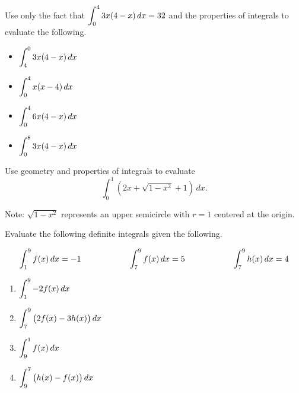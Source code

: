 \documentclass[12pt]{article}
\begin{document}
\Example Use only the fact that $\displaystyle\int_0^4 3x(4-x)\,dx=32$ and the properties of integrals to evaluate the following.
\begin{itemize}
	\item[\tc{1}] $\displaystyle\int_4^0 3x(4-x)\,dx$
	
	\vspace{15mm}
	
	\item[\tc{2}] $\displaystyle\int_0^4 x(x-4)\,dx$
	
	\vspace{15mm}
	
	\item[\tc{3}] $\displaystyle\int_0^4 6x(4-x)\,dx$
	
	\vspace{15mm}
	
	\item[\tc{4}] $\displaystyle\int_0^8 3x(4-x)\,dx$
	
	\vspace{15mm}
\end{itemize}

\newpage

\Example Use geometry and properties of integrals to evaluate
$$\int_0^1 \left( 2x+\sqrt{1-x^2}+1\right)\,dx.$$

\vspace{1mm}

Note: $\sqrt{1-x^2}$ represents an upper semicircle with $r=1$ centered at the origin.

\vspace{60mm}

\Example Evaluate the following definite integrals given the following.

$$\int_1^9 f(x)\,dx=-1\hspace{20mm}\int_7^9 f(x)\,dx=5\hspace{20mm}\int_7^9 h(x)\,dx=4$$

\begin{enumerate}
	\item[\tc{1}] $\displaystyle\int_1^9 -2f(x)\,dx$
	
	\vspace{15mm}
	
	\item[\tc{2}] $\displaystyle\int_7^9\big(2f(x)-3h(x)\big)\,dx$
	
	\vspace{15mm}
	
	\item[\tc{3}] $\displaystyle\int_9^1 f(x)\,dx$
	
	\vspace{15mm}
	
	\item[\tc{4}] $\displaystyle\int_9^7 \big( h(x)-f(x)\big)\,dx$
\end{enumerate}
\end{document}
